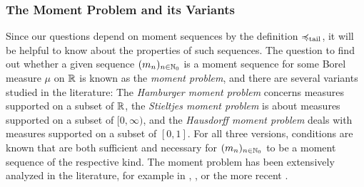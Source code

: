 \documentclass[a4paper]{scrreprt}
\theoremstyle{definition}
\newtheorem{defn}[thm]{Definition} %
\begin{document}
    \subsubsection{The Moment Problem and its Variants}
    Since our questions depend on moment sequences by the definition $\preccurlyeq_{\text{tail}}$, it will be helpful to know about the properties of such sequences.
    The question to find out whether a given sequence $(m_n)_{n \in \mathbb{N}_0}$ is a moment sequence for some Borel measure $\mu$ on $\mathbb{R}$ is known as the \emph{moment problem}, and there are several variants studied in the literature:
    The \emph{Hamburger moment problem} concerns measures supported on a subset of $\mathbb{R}$, the \emph{Stieltjes moment problem} is about measures supported on a subset of $[0, \infty)$,
    and the \emph{Hausdorff moment problem} deals with measures supported on a subset of $[0, 1]$. For all three versions, conditions are known that are both sufficient and necessary for $(m_n)_{n \in \mathbb{N}_0}$ to be a moment sequence of the respective kind.
    The moment problem has been extensively analyzed in the literature, for example in \cite{bib:shohatTheProblemOfMoments}, \cite{bib:akhiezerClassicalMomentProblem}, or the more recent \cite{bib:schmuedgenTheMomentProblem}.
%    
\end{document}
